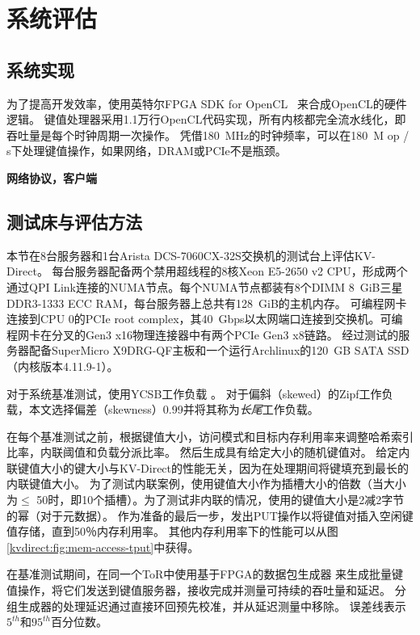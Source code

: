\section{系统评估}
\label{kvdirect:sec:eval}
\label{kvdirect:sec:evaluation}
\label{kvdirect:sec:system-benchmark}

\subsection{系统实现}

为了提高开发效率，使用英特尔FPGA SDK for OpenCL~ \cite {aoc}来合成OpenCL的硬件逻辑。
键值处理器采用1.1万行OpenCL代码实现，所有内核都完全流水线化，即吞吐量是每个时钟周期一次操作。
凭借180~MHz的时钟频率，可以在180~M op / s下处理键值操作，如果网络，DRAM或PCIe不是瓶颈。


\textbf{网络协议，客户端}


\subsection{测试床与评估方法}

本节在8台服务器和1台Arista DCS-7060CX-32S交换机的测试台上评估KV-Direct。
每台服务器配备两个禁用超线程的8核Xeon E5-2650 v2 CPU，形成两个通过QPI Link连接的NUMA节点。每个NUMA节点都装有8个DIMM 8~GiB三星DDR3-1333 ECC RAM，每台服务器上总共有128~GiB的主机内存。
可编程网卡~ \cite {caulfield2016cloud}连接到CPU 0的PCIe root complex，其40~Gbps以太网端口连接到交换机。可编程网卡在分叉的Gen3 x16物理连接器中有两个PCIe Gen3 x8链路。
经过测试的服务器配备SuperMicro X9DRG-QF主板和一个运行Archlinux的120~GB SATA SSD（内核版本4.11.9-1）。

对于系统基准测试，使用YCSB工作负载 \cite {cooper2010benchmarking}。
对于偏斜（skewed）的Zipf工作负载，本文选择偏差（skewness）0.99并将其称为\textit {长尾}工作负载。

在每个基准测试之前，根据键值大小，访问模式和目标内存利用率来调整哈希索引比率，内联阈值和负载分派比率。
然后生成具有给定大小的随机键值对。
给定内联键值大小的键大小与KV-Direct的性能无关，因为在处理期间将键填充到最长的内联键值大小。
为了测试内联案例，使用键值大小作为插槽大小的倍数（当大小为$ \leq $ 50时，即10个插槽）。为了测试非内联的情况，使用的键值大小是2减2字节的幂（对于元数据）。
作为准备的最后一步，发出PUT操作以将键值对插入空闲键值存储，直到50％内存利用率。
其他内存利用率下的性能可以从图 \ref {kvdirect:fig:mem-access-tput}中获得。

在基准测试期间，在同一个ToR中使用基于FPGA的数据包生成器 \cite {li2016clicknp}来生成批量键值操作，将它们发送到键值服务器，接收完成并测量可持续的吞吐量和延迟。
分组生成器的处理延迟通过直接环回预先校准，并从延迟测量中移除。
误差线表示$ 5^{th} $和$ 95^{th} $百分位数。

